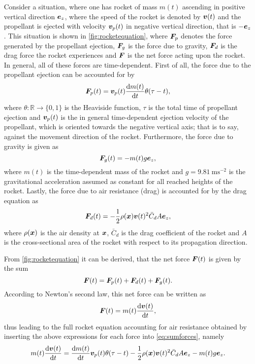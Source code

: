 \documentclass[a4paper,11pt]{report}
\begin{document}
Consider a situation, where one has rocket of mass $m(t)$ ascending in positive vertical direction $\bm{e}_z$, where the speed of the rocket is denoted by $\bm{v}(t)$ and the propellant is ejected with velocity $\bm{v}_p(t)$ in negative vertical direction, that is $-\bm{e}_z$. This situation is shown in \cref{fig:rocketequation}, where $\bm{F}_p$ denotes the force generated by the propellant ejection, $\bm{F}_g$ is the force due to gravity, $\bm{F}_d$ is the drag force the rocket experiences and $\bm{F}$ is the net force acting upon the rocket. In general, all of these forces are time-dependent. First of all, the force due to the propellant ejection can be accounted for by \begin{equation}
\bm{F}_p(t) = \bm{v}_p(t)\frac{\mathrm{d}m(t)}{\mathrm{d}t}\theta(\tau-t),
\end{equation} where $\theta: \mathbb{R}\rightarrow \{0,1\}$ is the Heaviside function, $\tau$ is the total time of propellant ejection and $\bm{v}_p(t)$ is the in general time-dependent ejection velocity of the propellant, which is oriented towards the negative vertical axis; that is to say, against the movement direction of the rocket. Furthermore, the force due to gravity is given as \begin{equation}
\bm{F}_g(t) = -m(t)g\bm{e}_z,
\end{equation} where $m(t)$ is the time-dependent mass of the rocket and $g=\SI{9.81}{\meter\second^{-2}}$ is the gravitational acceleration assumed as constant for all reached heights of the rocket. Lastly, the force due to air resistance (drag) is accounted for by the drag equation as \begin{equation}
\bm{F}_d(t) = -\frac{1}{2}\rho(\bm{x})\bm{v}(t)^2 \bar{C}_d A \bm{e}_z,
\end{equation} where $\rho(\bm{x})$ is the air density at $\bm{x}$, $\bar{C}_d$ is the drag coefficient of the rocket and $A$ is the cross-sectional area of the rocket with respect to its propagation direction.

From \cref{fig:rocketequation} it can be derived, that the net force $\bm{F}(t)$ is given by the sum \begin{equation}\label{eq:sumforces}
\bm{F}(t) = \bm{F}_p(t) + \bm{F}_d(t) + \bm{F}_g(t).
\end{equation} According to Newton's second law, this net force can be written as \begin{equation}
\bm{F}(t) = m(t)\frac{\mathrm{d}\bm{v}(t)}{\mathrm{d}t},
\end{equation} thus leading to the full rocket equation accounting for air resistance obtained by inserting the above expressions for each force into \cref{eq:sumforces}, namely \begin{equation}
m(t)\frac{\mathrm{d}\bm{v}(t)}{\mathrm{d}t} = \frac{\mathrm{d}m(t)}{\mathrm{d}t}\bm{v}_p(t)\theta(\tau-t) - \frac{1}{2}\rho(\bm{x})\bm{v}(t)^2\bar{C}_dA\bm{e}_z - m(t)g\bm{e}_z.
\end{equation}
\end{document}
